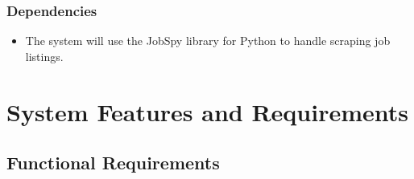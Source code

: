 \documentclass[titlepage]{article}
\begin{document}
\subsubsection{Dependencies}

\begin{itemize}
    \item The system will use the JobSpy library for Python to handle scraping job listings.
\end{itemize}

\section{System Features and Requirements}

\subsection{Functional Requirements}
\end{document}
